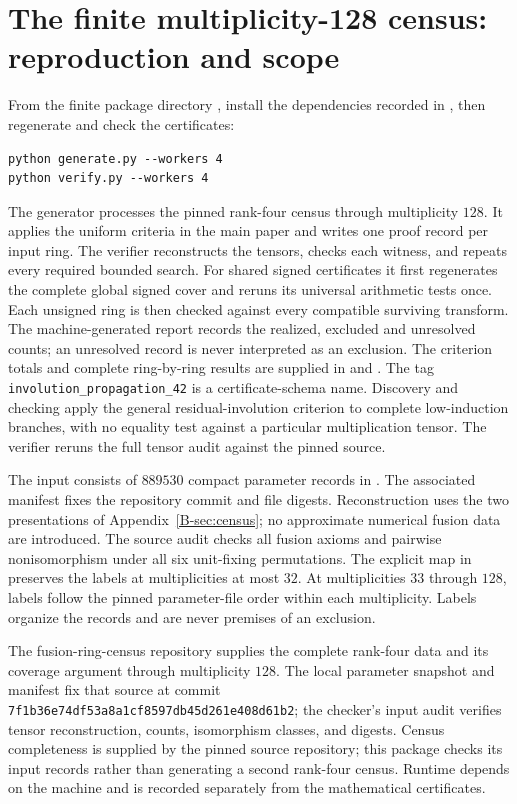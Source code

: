 \documentclass[11pt]{article}
\begin{document}
\section{The finite multiplicity-128 census: reproduction and scope}
From the finite package directory , install the dependencies recorded in
, then regenerate and check the certificates:
\begin{verbatim}
python generate.py --workers 4
python verify.py --workers 4
\end{verbatim}
The generator processes the pinned rank-four census through multiplicity
$128$. It applies the uniform criteria in the main paper and writes
one proof record per input ring. The verifier reconstructs the tensors,
checks each witness, and repeats every required bounded search.
For shared signed certificates it first regenerates the complete global
signed cover and reruns its universal arithmetic tests once. Each
unsigned ring is then checked against every compatible surviving
transform. The machine-generated report  records
the realized, excluded and unresolved counts; an unresolved record is
never interpreted as an exclusion. The criterion totals and complete
ring-by-ring results are supplied in
 and
.
The tag \texttt{involution\_propagation\_42} is a certificate-schema
name. Discovery and checking apply the general residual-involution
criterion to complete low-induction branches, with no equality test against
a particular multiplication tensor.
The verifier reruns the full tensor audit against the pinned source.

The input consists of $889530$ compact parameter records in
. The associated manifest fixes the
repository commit and file digests. Reconstruction uses the two
presentations of Appendix~\ref{B-sec:census}; no approximate numerical
fusion data are introduced. The source audit checks all fusion axioms
and pairwise nonisomorphism under all six unit-fixing permutations.
The explicit map in  preserves the
labels at multiplicities at most $32$. At multiplicities $33$ through
$128$, labels follow the pinned parameter-file order within each
multiplicity. Labels organize the records and are never premises of
an exclusion.

The fusion-ring-census repository supplies the complete rank-four data
and its coverage argument through multiplicity $128$. The local parameter
snapshot and manifest fix that source at commit
\texttt{7f1b36e74df53a8a1cf8597db45d261e408d61b2}; the checker's
input audit verifies tensor reconstruction, counts, isomorphism classes,
and digests. Census completeness is supplied by the pinned source
repository; this package checks its input records rather than generating
a second rank-four census.
Runtime depends on the machine and is recorded separately from the
mathematical certificates.
\end{document}
